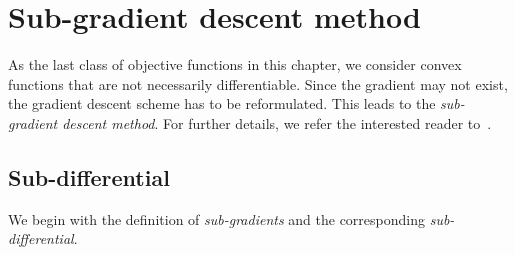\documentclass[12pt,openany]{book}
\theoremstyle{definition}
\theoremstyle{definition}
\begin{document}
\section{Sub-gradient descent method}
As the last class of objective functions in this chapter, we consider convex functions that are not
necessarily differentiable. Since the gradient may not exist, the gradient descent scheme has to be
reformulated. This leads to the \textit{sub-gradient descent method}. For further details, we refer the interested reader to~\cite[Section~3.1]{Lan2021}. 

\subsection{Sub-differential}
We begin with the definition of \textit{sub-gradients} and the corresponding \textit{sub-differential}.
\end{document}
